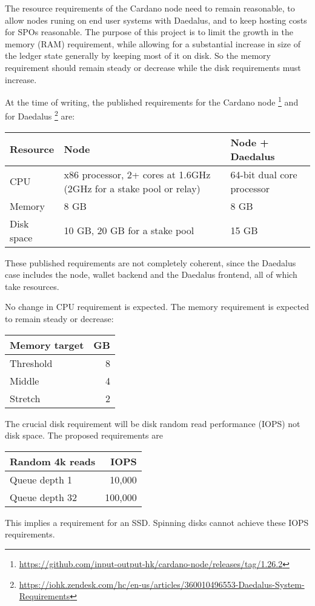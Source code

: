 \documentclass[11pt,a4paper]{article}
\begin{document}
The resource requirements of the Cardano node need to remain reasonable, to
allow nodes runing on end user systems with Daedalus, and to keep hosting costs
for SPOs reasonable. The purpose of this project is to limit the growth in the
memory (RAM) requirement, while allowing for a substantial increase in size of
the ledger state generally by keeping most of it on disk. So the memory
requirement should remain steady or decrease while the disk requirements must
increase.

At the time of writing, the published requirements for the Cardano node%
\footnote{\url{https://github.com/input-output-hk/cardano-node/releases/tag/1.26.2}}
and for Daedalus%
\footnote{\url{https://iohk.zendesk.com/hc/en-us/articles/360010496553-Daedalus-System-Requirements}}
are:

\begin{center}
\begin{tabular}[]{lp{6cm}p{5cm}}
  Resource    & Node & Node + Daedalus \\
  \toprule
  CPU         &  x86 processor, 2+ cores at 1.6GHz (2GHz for a stake pool or relay)  & 64-bit dual core processor \\
  Memory      &  8 GB  & 8 GB \\
  Disk space  & 10 GB, 20 GB for a stake pool & 15 GB
\end{tabular}
\end{center}

These published requirements are not completely coherent, since the Daedalus
case includes the node, wallet backend and the Daedalus frontend, all of which
take resources.

No change in CPU requirement is expected. The memory requirement is expected
to remain steady or decrease:
\begin{center}
\begin{tabular}[]{lr}
  Memory target & GB \\
  \toprule
  Threshold &  8 \\
  Middle    &  4 \\
  Stretch   &  2
\end{tabular}
\end{center}
The crucial disk requirement will be disk random read performance (IOPS) not
disk space. The proposed requirements are
\begin{center}
\begin{tabular}[]{lr}
  Random 4k reads & IOPS \\
  \toprule
  Queue depth 1  &  10,000 \\
  Queue depth 32 & 100,000 \\
\end{tabular}
\end{center}
This implies a requirement for an SSD. Spinning disks cannot achieve these IOPS
requirements.
\end{document}
